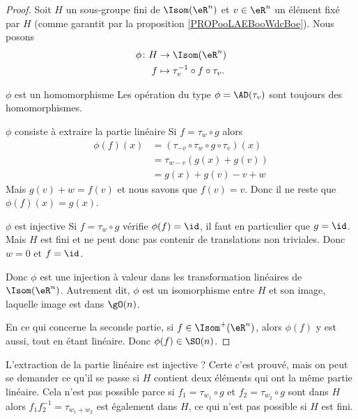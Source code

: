 \begin{proof}
    Soit \( H\) un sous-groupe fini de \( \Isom(\eR^n)\) et \( v\in \eR^n\) un élément fixé par \( H\) (comme garantit par la proposition \ref{PROPooLAEBooWdcBoe}). Nous posons
    \begin{equation}
        \begin{aligned}
            \phi\colon H&\to \Isom(\eR^n) \\
            f&\mapsto \tau_v^{-1}\circ f\circ \tau_v. 
        \end{aligned}
    \end{equation}

    \begin{subproof}
        \item[\( \phi\) est un homomorphisme]
            Les opération du type \( \phi=\AD(\tau_v)\) sont toujours des homomorphismes.
        \item[\( \phi\) consiste à extraire la partie linéaire]
            Si \( f=\tau_w\circ g\) alors
            \begin{subequations}
                \begin{align}
                    \phi(f)(x)&=(\tau_{-v}\circ\tau_w\circ g\circ\tau_v)(x)\\
                    &=\tau_{w-v}(   g(x)+g(v)  )\\
                    &=g(x)+g(v)-v+w
                \end{align}
            \end{subequations}
            Mais \( g(v)+w=f(v)\) et nous savons que \( f(v)=v\). Donc il ne reste que \( \phi(f)(x)=g(x)\).
        \item[\( \phi\) est injective]
            Si \( f=\tau_w\circ g\) vérifie \( \phi(f)=\id\), il faut en particulier que \( g=\id\). Mais \( H\) est fini et ne peut donc pas contenir de translations non triviales. Donc \( w=0\) et \( f=\id\).
    \end{subproof}
    Donc \( \phi\) est une injection à valeur dans les transformation linéaires de \( \Isom(\eR^n)\). Autrement dit, \( \phi\) est un isomorphisme entre \( H\) et son image, laquelle image est dans \( \gO(n)\).

    En ce qui concerne la seconde partie, si \( f\in\Isom^+(\eR^n)\), alors \( \phi(f)\) y est aussi, tout en étant linéaire. Donc \( \phi(f)\in \SO(n)\).
\end{proof}

L'extraction de la partie linéaire est injective ? Certe c'est prouvé, mais on peut se demander ce qu'il se passe si \( H\) contient deux éléments qui ont la même partie linéaire. Cela n'est pas possible parce si \( f_1=\tau_{w_1}\circ g\) et \( f_2=\tau_{w_2}\circ g\) sont dans \( H\) alors \( f_1f_2^{-1}=\tau_{w_1+w_2}\) est également dans \( H\), ce qui n'est pas possible si \( H\) est fini.

